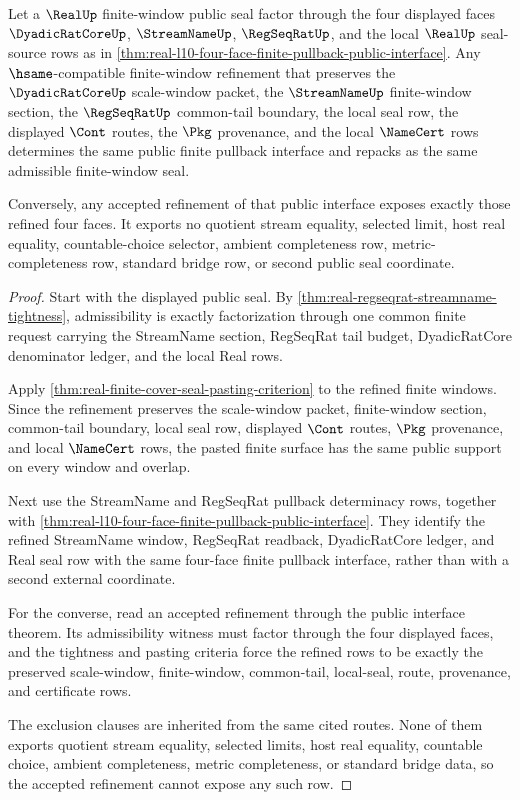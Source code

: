 \begin{theorem}
\label{thm:real-l10-four-face-refinement-stability}
Let a $\RealUp$ finite-window public seal factor through the four displayed faces $\DyadicRatCoreUp$, $\StreamNameUp$, $\RegSeqRatUp$, and the local $\RealUp$ seal-source rows as in \autoref{thm:real-l10-four-face-finite-pullback-public-interface}. Any $\hsame$-compatible finite-window refinement that preserves the $\DyadicRatCoreUp$ scale-window packet, the $\StreamNameUp$ finite-window section, the $\RegSeqRatUp$ common-tail boundary, the local seal row, the displayed $\Cont$ routes, the $\Pkg$ provenance, and the local $\NameCert$ rows determines the same public finite pullback interface and repacks as the same admissible finite-window seal.

Conversely, any accepted refinement of that public interface exposes exactly those refined four faces. It exports no quotient stream equality, selected limit, host real equality, countable-choice selector, ambient completeness row, metric-completeness row, standard bridge row, or second public seal coordinate.
\end{theorem}
\begin{proof}
Start with the displayed public seal. By \autoref{thm:real-regseqrat-streamname-tightness}, admissibility is exactly factorization through one common finite request carrying the StreamName section, RegSeqRat tail budget, DyadicRatCore denominator ledger, and the local Real rows.

Apply \autoref{thm:real-finite-cover-seal-pasting-criterion} to the refined finite windows. Since the refinement preserves the scale-window packet, finite-window section, common-tail boundary, local seal row, displayed $\Cont$ routes, $\Pkg$ provenance, and local $\NameCert$ rows, the pasted finite surface has the same public support on every window and overlap.

Next use the StreamName and RegSeqRat pullback determinacy rows, together with \autoref{thm:real-l10-four-face-finite-pullback-public-interface}. They identify the refined StreamName window, RegSeqRat readback, DyadicRatCore ledger, and Real seal row with the same four-face finite pullback interface, rather than with a second external coordinate.

For the converse, read an accepted refinement through the public interface theorem. Its admissibility witness must factor through the four displayed faces, and the tightness and pasting criteria force the refined rows to be exactly the preserved scale-window, finite-window, common-tail, local-seal, route, provenance, and certificate rows.

The exclusion clauses are inherited from the same cited routes. None of them exports quotient stream equality, selected limits, host real equality, countable choice, ambient completeness, metric completeness, or standard bridge data, so the accepted refinement cannot expose any such row.
\end{proof}

